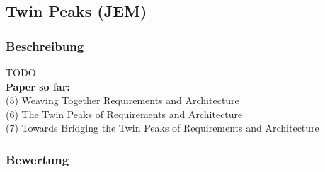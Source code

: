 \subsection{Twin Peaks (JEM)}

\subsubsection{Beschreibung}

TODO \\


\textbf{Paper so far:} \\
(5) Weaving Together Requirements and Architecture \\
(6) The Twin Peaks of Requirements and Architecture \\
(7) Towards Bridging the Twin Peaks of Requirements and Architecture \\

\subsubsection{Bewertung}
